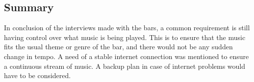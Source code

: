 \subsection{Summary}
\label{sub:summary}

In conclusion of the interviews made with the bars, a common requirement is still having control over what music is being played. This is to ensure that the music fits the usual theme or genre of the bar, and there would not be any sudden change in tempo. A need of a stable internet connection was mentioned to ensure a continuous stream of music. A backup plan in case of internet problems would have to be considered.
